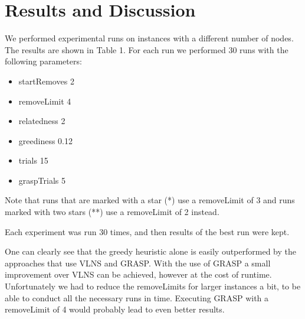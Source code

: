 \documentclass[a4paper]{scrartcl}
\begin{document}
\section{Results and Discussion}

We performed experimental runs on instances with a different number of nodes. The results are shown in Table 1. For each run we performed 30 runs with the following parameters:

\begin{itemize}
 \item startRemoves 2
 \item removeLimit 4
 \item relatedness 2
 \item greediness 0.12
 \item trials 15
 \item graspTrials 5
\end{itemize}

Note that runs that are marked with a star (*) use a removeLimit of 3 and runs marked with two stars (**) use a removeLimit of 2 instead.

Each experiment was run 30 times, and then results of the best run were kept.

One can clearly see that the greedy heuristic alone is easily outperformed by the approaches that use VLNS and GRASP.  With the use of GRASP a small improvement over VLNS can be achieved, however at the cost of runtime. Unfortunately we had to reduce the removeLimits for larger instances a bit, to be able to conduct all the necessary runs in time. Executing GRASP with a removeLimit of 4 would probably lead to even better results.
\end{document}
